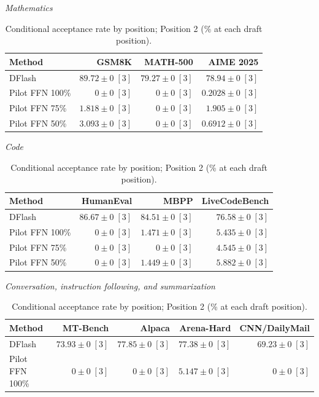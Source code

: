 \documentclass[conference,onecolumn]{IEEEtran}
\begin{document}
\begin{table}[!htp]
\centering\small
\setlength{\tabcolsep}{3pt}
\caption{Conditional acceptance rate by position; Position 2 (\% at each draft position).}
\label{tab:appendix-metric-conditional-acceptance-2}
\textit{Mathematics}\par\smallskip
\begin{tabular}{@{}>{\raggedright\arraybackslash}p{3.7cm}rrr@{}}
\toprule
Method & GSM8K & MATH-500 & AIME 2025 \\
\midrule
DFlash & \(\mathbf{89.72} \pm 0\;[3]\) & \(\mathbf{79.27} \pm 0\;[3]\) & \(\mathbf{78.94} \pm 0\;[3]\) \\
Pilot FFN 100\% & \(0 \pm 0\;[3]\) & \(0 \pm 0\;[3]\) & \(0.2028 \pm 0\;[3]\) \\
Pilot FFN 75\% & \(1.818 \pm 0\;[3]\) & \(0 \pm 0\;[3]\) & \(1.905 \pm 0\;[3]\) \\
Pilot FFN 50\% & \(3.093 \pm 0\;[3]\) & \(0 \pm 0\;[3]\) & \(0.6912 \pm 0\;[3]\) \\
\bottomrule
\end{tabular}\par\medskip
\textit{Code}\par\smallskip
\begin{tabular}{@{}>{\raggedright\arraybackslash}p{3.7cm}rrr@{}}
\toprule
Method & HumanEval & MBPP & LiveCodeBench \\
\midrule
DFlash & \(\mathbf{86.67} \pm 0\;[3]\) & \(\mathbf{84.51} \pm 0\;[3]\) & \(\mathbf{76.58} \pm 0\;[3]\) \\
Pilot FFN 100\% & \(0 \pm 0\;[3]\) & \(1.471 \pm 0\;[3]\) & \(5.435 \pm 0\;[3]\) \\
Pilot FFN 75\% & \(0 \pm 0\;[3]\) & \(0 \pm 0\;[3]\) & \(4.545 \pm 0\;[3]\) \\
Pilot FFN 50\% & \(0 \pm 0\;[3]\) & \(1.449 \pm 0\;[3]\) & \(5.882 \pm 0\;[3]\) \\
\bottomrule
\end{tabular}\par\medskip
\textit{Conversation, instruction following, and summarization}\par\smallskip
\begin{tabular}{@{}>{\raggedright\arraybackslash}p{3.7cm}rrrr@{}}
\toprule
Method & MT-Bench & Alpaca & Arena-Hard & CNN/DailyMail \\
\midrule
DFlash & \(\mathbf{73.93} \pm 0\;[3]\) & \(\mathbf{77.85} \pm 0\;[3]\) & \(\mathbf{77.38} \pm 0\;[3]\) & \(\mathbf{69.23} \pm 0\;[3]\) \\
Pilot FFN 100\% & \(0 \pm 0\;[3]\) & \(0 \pm 0\;[3]\) & \(5.147 \pm 0\;[3]\) & \(0 \pm 0\;[3]\) \\

\end{tabular}
\end{table}
\end{document}
